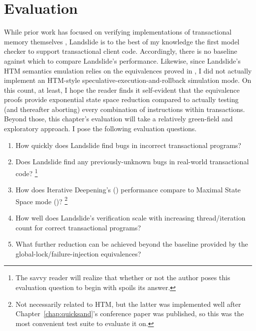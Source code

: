 
\section{Evaluation}

While prior work has focused on verifying implementations of transactional memory themselves
\cite{specifying-verifying-tm,tm-correctness,tm-completeness,mc-tm-with-spin},
Landslide is to the best of my knowledge the first model checker to support transactional client code.
Accordingly, there is no baseline against which to compare Landslide's performance.
Likewise, since Landslide's HTM semantics emulation relies on the equivalences proved in \sect{\ref{sec:tm-design}},
I did not actually implement an HTM-style speculative-execution-and-rollback simulation mode.
On this count, at least,
I hope the reader finds it self-evident that
the equivalence proofs provide exponential state space reduction
compared to actually testing (and thereafter aborting) every combination of instructions within transactions.
Beyond those, this chapter's evaluation will take a relatively green-field and exploratory approach.
I pose the following evaluation questions.


\begin{enumerate}
	\item How quickly does Landslide find bugs in incorrect transactional programs? %
	\item Does Landslide find any previously-unknown bugs in real-world transactional code?%
		\footnote{The savvy reader will realize that whether or not the author poses this evaluation question to begin with spoils its answer.}
	\item How does Iterative Deepening's (\sect{\ref{sec:quicksand-id}})
		performance compare to Maximal State Space mode (\sect{\ref{sec:landslide-quicksand-options}})?%
		\footnote{Not necessarily related to HTM,
		but the latter was implemented well after Chapter~\ref{chap:quicksand}'s conference paper was published,
		so this was the most convenient test suite to evaluate it on.}
	\item How well does Landslide's verification scale
		with increasing thread/iteration count for correct transactional programs?
	\item What further reduction can be achieved beyond the baseline provided by
		the global-lock/failure-injection equivalences?
\end{enumerate}

